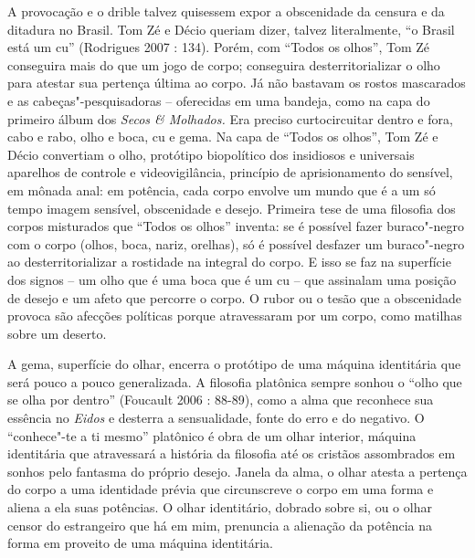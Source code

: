 A provocação e o drible talvez quisessem expor a obscenidade da censura
e da ditadura no Brasil. Tom Zé e Décio queriam dizer, talvez
literalmente, ``o Brasil está um cu'' (Rodrigues 2007 : 134). Porém, com
``Todos os olhos'', Tom Zé conseguira mais do que um jogo de
corpo; conseguira desterritorializar o olho para atestar sua pertença
última ao corpo. Já não bastavam os rostos mascarados e as
cabeças"-pesquisadoras -- oferecidas em uma bandeja, como na capa do
primeiro álbum dos \emph{Secos \& Molhados.} Era preciso curtocircuitar
dentro e fora, cabo e rabo, olho e boca, cu e gema. Na capa de ``Todos
os olhos'', Tom Zé e Décio convertiam o olho, protótipo biopolítico dos
insidiosos e universais aparelhos de controle e videovigilância,
princípio de aprisionamento do sensível, em mônada anal: em potência,
cada corpo envolve um mundo que é a um só tempo imagem sensível,
obscenidade e desejo. Primeira tese de uma filosofia dos corpos
misturados que ``Todos os olhos'' inventa: se é possível fazer
buraco"-negro com o corpo (olhos, boca, nariz, orelhas), só é possível
desfazer um buraco"-negro ao desterritorializar a rostidade na integral
do corpo. E isso se faz na superfície dos signos -- um olho que é uma
boca que é um cu -- que assinalam uma posição de desejo e um afeto que
percorre o corpo. O rubor ou o tesão que a obscenidade provoca são
afecções políticas porque atravessaram por um corpo, como matilhas sobre
um deserto.

A gema, superfície do olhar, encerra o protótipo de uma máquina
identitária que será pouco a pouco generalizada. A filosofia platônica
sempre sonhou o ``olho que se olha por dentro'' (Foucault 2006 : 88-89),
como a alma que reconhece sua essência no \emph{Eidos} e desterra a
sensualidade, fonte do erro e do negativo. O ``conhece"-te a ti mesmo''
platônico é obra de um olhar interior, máquina identitária que
atravessará a história da filosofia até os cristãos assombrados em
sonhos pelo fantasma do próprio desejo. Janela da alma, o olhar atesta a
pertença do corpo a uma identidade prévia que circunscreve o corpo em
uma forma e aliena a ela suas potências. O olhar identitário, dobrado
sobre si, ou o olhar censor do estrangeiro que há em mim, prenuncia a
alienação da potência na forma em proveito de uma máquina identitária.

